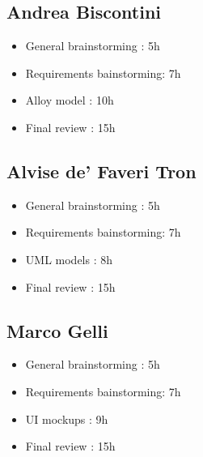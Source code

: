 \subsection{Andrea Biscontini}
\begin{itemize}
	\item General brainstorming : 5h
	\item Requirements bainstorming: 7h
	\item Alloy model : 10h
	\item Final review : 15h
\end{itemize}
\subsection{Alvise de' Faveri Tron}
\begin{itemize}
	\item General brainstorming : 5h
	\item Requirements bainstorming: 7h
	\item UML models : 8h
	\item Final review : 15h
\end{itemize}
\subsection{Marco Gelli}
\begin{itemize}
	\item General brainstorming : 5h
	\item Requirements bainstorming: 7h
	\item UI mockups : 9h
	\item Final review : 15h
\end{itemize}